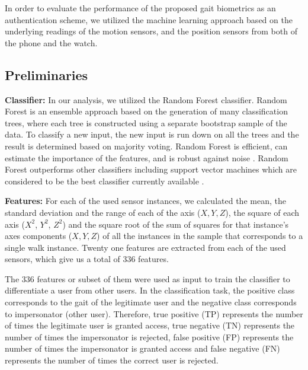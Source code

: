 



\vspace{-1mm}
In order to evaluate the performance of the proposed gait biometrics as
an authentication scheme, we utilized the machine learning approach based on
the underlying readings of the motion sensors, and the position sensors from both of the phone and the watch. 

\vspace{-4mm}
\subsection{Preliminaries}
\vspace{-2mm}
\noindent\textbf{Classifier:} In our analysis, we utilized the Random Forest classifier. Random Forest is an ensemble approach based on the generation of many
classification trees, where each tree is constructed using a separate bootstrap
sample of the data. To classify a new input, the new input is run down on
all the trees and the result is determined based on majority voting. Random Forest is efficient, can estimate the
importance of the features, and is robust against noise \cite{maxion2010keystroke}. 
Random Forest outperforms other classifiers including support vector machines which are considered to be the best classifier currently available \cite{caruana2006empirical,liu2013comparison,maxion2010keystroke}.
 
\smallskip
\noindent\textbf{Features:} For each of the used sensor
instances, we calculated the mean, the standard deviation and the range of each of the axis ($X, Y, Z$), the square of each axis ($X^2$, $Y^2$, $Z^2$) and the square root of the sum of squares for that
instance's axes components ($X, Y, Z$) of
all the instances in the sample that corresponds to a single walk instance. Twenty one features are extracted from each of the used sensors, which give us a total of 336 features.


The 336 features or subset of them were used as input to train the classifier to
differentiate a user from other users.  
In the classification task, the positive class corresponds to the gait
of the legitimate user and the negative class corresponds to impersonator (other user).
Therefore, true positive (TP) represents the number of times the legitimate
user is granted access, true negative (TN) represents the number of times
the impersonator is rejected, false positive (FP) represents the number of
times the impersonator is granted access and false negative (FN) represents the
number of times the correct user is rejected.

